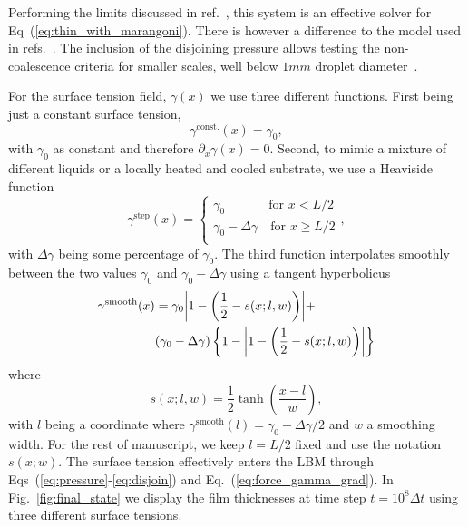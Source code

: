 \documentclass[twocolumn,amsmath,amssymb,showpacs,pre,nofootinbib,superscriptaddress]{revtex4-1} %
\begin{document}
Performing the limits discussed in ref.~\cite{PhysRevE.100.033313, PhysRevE.104.034801}, this system is an effective solver for Eq~(\ref{eq:thin_with_marangoni}).
There is however a difference to the model used in refs.~\cite{doi:10.1021/la500459v, karpitschka2014sharp}.
The inclusion of the disjoining pressure allows testing the non-coalescence criteria for smaller scales, well below $1mm$ droplet diameter~\cite{karpitschka2014sharp}.

For the surface tension field, $\gamma(x)$ we use three different functions.
First being just a constant surface tension, 
\begin{equation}\label{eq:gamma_const}
    \gamma^{\text{const.}}(x) = \gamma_0,
\end{equation}
with $\gamma_0$ as constant and therefore $\partial_x\gamma(x) = 0$.
Second, to mimic a mixture of different liquids or a locally heated and cooled substrate, we use a Heaviside function
\begin{equation}\label{eq:gamma_step}
    \gamma^{\text{step}}(x) = \begin{cases}
    \gamma_0\quad~~\qquad \text{for $x < L/2$}\\
    \gamma_0 - \Delta\gamma \quad \text{for $x \ge L/2$}\\
    \end{cases},
\end{equation}
with $\Delta\gamma$ being some percentage of $\gamma_0$.
The third function interpolates smoothly between the two values $\gamma_0$ and $\gamma_0 -\Delta\gamma$ using a tangent hyperbolicus
\begin{align}\label{eq:gamma_tanh}
    \gamma^{\text{smooth}}(x) &= \gamma_0\abs{1 - \left(\frac{1}{2} - s(x;l,w)\right)} + \nonumber\\
    &(\gamma_0 - \Delta\gamma)\left\{1 - \abs{1 - \left(\frac{1}{2} - s(x;l,w)\right)}\right\} 
\end{align}
where
\begin{equation}\label{eq:smoothing}
    s(x;l,w) = \frac{1}{2}\tanh\left(\frac{x - l}{w}\right),
\end{equation}
with $l$ being a coordinate where $\gamma^{\text{smooth}}(l) = \gamma_0 -\Delta\gamma/2$ and $w$ a smoothing width. 
For the rest of manuscript, we keep $l=L/2$ fixed and use the notation $s(x;w)$.
The surface tension effectively enters the LBM through Eqs~(\ref{eq:pressure}-\ref{eq:disjoin}) and Eq.~(\ref{eq:force_gamma_grad}).
In Fig.~\ref{fig:final_state} we display the film thicknesses at time step $t = 10^8\Delta t$ using three different surface tensions.
\end{document}
